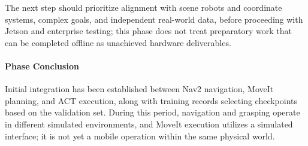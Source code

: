 The next step should prioritize alignment with scene robots and coordinate systems, complex goals, and independent real-world data, before proceeding with Jetson and enterprise testing; this phase does not treat preparatory work that can be completed offline as unachieved hardware deliverables.


\paragraph{Phase Conclusion} Initial integration has been established between Nav2 navigation, MoveIt planning, and ACT execution, along with training records selecting checkpoints based on the validation set. During this period, navigation and grasping operate in different simulated environments, and MoveIt execution utilizes a simulated interface; it is not yet a mobile operation within the same physical world.


\FloatBarrier
